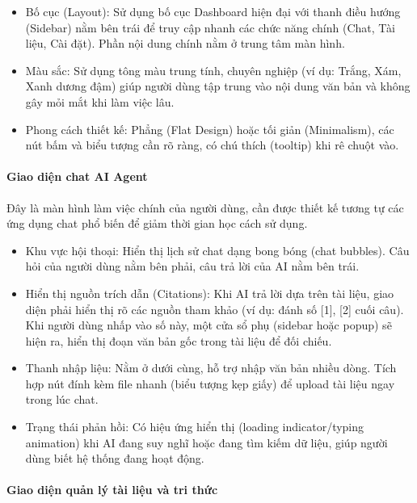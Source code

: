 \begin{itemize}
\item
  Bố cục (Layout): Sử dụng bố cục Dashboard hiện đại với thanh điều
  hướng (Sidebar) nằm bên trái để truy cập nhanh các chức năng chính
  (Chat, Tài liệu, Cài đặt). Phần nội dung chính nằm ở trung tâm màn
  hình.
\item
  Màu sắc: Sử dụng tông màu trung tính, chuyên nghiệp (ví dụ: Trắng,
  Xám, Xanh dương đậm) giúp người dùng tập trung vào nội dung văn bản và
  không gây mỏi mắt khi làm việc lâu.
\item
  Phong cách thiết kế: Phẳng (Flat Design) hoặc tối giản (Minimalism),
  các nút bấm và biểu tượng cần rõ ràng, có chú thích (tooltip) khi rê
  chuột vào.
\end{itemize}

\paragraph{Giao diện chat AI Agent}\label{giao-diux1ec7n-chat-ai-agent}

Đây là màn hình làm việc chính của người dùng, cần được thiết kế tương
tự các ứng dụng chat phổ biến để giảm thời gian học cách sử dụng.

\begin{itemize}
\item
  Khu vực hội thoại: Hiển thị lịch sử chat dạng bong bóng (chat
  bubbles). Câu hỏi của người dùng nằm bên phải, câu trả lời của AI nằm
  bên trái.
\item
  Hiển thị nguồn trích dẫn (Citations): Khi AI trả lời dựa trên tài
  liệu, giao diện phải hiển thị rõ các nguồn tham khảo (ví dụ: đánh số
  {[}1{]}, {[}2{]} cuối câu). Khi người dùng nhấp vào số này, một cửa sổ
  phụ (sidebar hoặc popup) sẽ hiện ra, hiển thị đoạn văn bản gốc trong
  tài liệu để đối chiếu.
\item
  Thanh nhập liệu: Nằm ở dưới cùng, hỗ trợ nhập văn bản nhiều dòng. Tích
  hợp nút đính kèm file nhanh (biểu tượng kẹp giấy) để upload tài liệu
  ngay trong lúc chat.
\item
  Trạng thái phản hồi: Có hiệu ứng hiển thị (loading indicator/typing
  animation) khi AI đang suy nghĩ hoặc đang tìm kiếm dữ liệu, giúp người
  dùng biết hệ thống đang hoạt động.
\end{itemize}

\paragraph{Giao diện quản lý tài liệu và tri
thức}\label{giao-diux1ec7n-quux1ea3n-luxfd-tuxe0i-liux1ec7u-vuxe0-tri-thux1ee9c}

